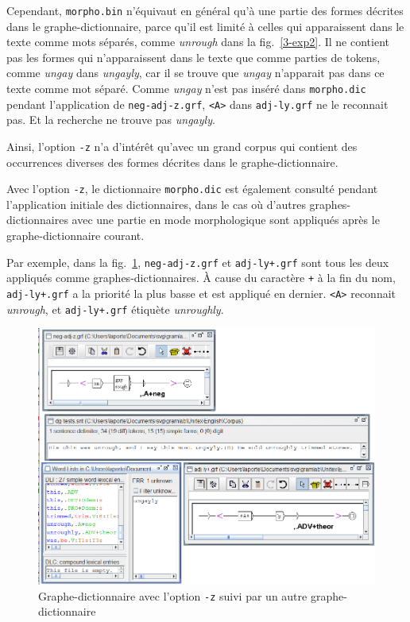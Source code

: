 \bigskip
\noindent Cependant, \verb+morpho.bin+ n'équivaut en général qu'à une partie des formes
décrites dans le graphe-dic\-tion\-naire, parce qu'il est limité à celles qui apparaissent dans le texte
comme mots séparés, comme \textit{unrough} dans la fig.~\ref{3-exp2}. Il ne contient pas les formes qui n'apparaissent dans le texte que comme parties de tokens, comme
\textit{ungay} dans \textit{ungayly}, car il se trouve que \textit{ungay} n'apparait pas dans ce
texte comme mot séparé. Comme \textit{ungay} n'est pas inséré dans \verb+morpho.dic+ pendant
l'application de \verb+neg-adj-z.grf+, \verb+<A>+ dans \verb+adj-ly.grf+ ne le reconnait pas.
Et la recherche ne trouve pas \textit{ungayly}.

\bigskip
\noindent Ainsi, l'option \verb+-z+ n'a d'intérêt qu'avec un grand corpus qui contient des
occurrences diverses des formes décrites dans le graphe-dic\-tion\-naire.

\bigskip
\noindent Avec l'option \verb+-z+, le dictionnaire \verb+morpho.dic+ est également consulté
pendant l'application initiale des dictionnaires, dans le cas où d'autres graphes-dictionnaires avec une partie en mode morphologique sont appliqués après le graphe-dic\-tion\-naire courant.

\bigskip
\noindent Par exemple, dans la fig.~\ref{3-exp4}, \verb+neg-adj-z.grf+ et \verb!adj-ly+.grf! sont
tous les deux appliqués comme graphes-dictionnaires. À cause du caractère \verb$+$ à la fin
du nom, \verb!adj-ly+.grf! a la priorité la plus basse et est appliqué en dernier.
\verb+<A>+ reconnait \textit{unrough}, et \verb!adj-ly+.grf! étiquète \textit{unroughly}.

\begin{figure}[th]
\begin{center}
\includegraphics[width=15cm]{resources/img/fig3-exp4.png}
\caption{Graphe-dictionnaire avec l'option \texttt{-z} suivi par un autre graphe-dictionnaire\label{3-exp4}}
\end{center}
\end{figure}

